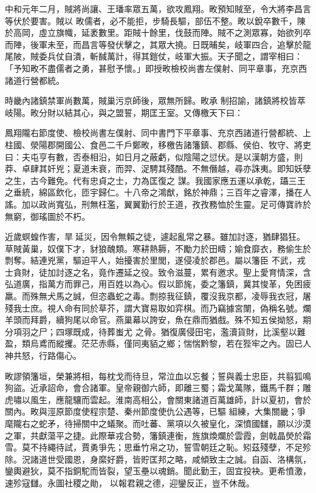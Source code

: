 \begin{pinyinscope}
 中和元年二月，賊將尚讓、王璠率眾五萬，欲攻鳳翔。畋預知賊至，令大將李昌言等伏於要害。賊以
 畋儒者，必不能拒，步騎長驅，部伍不整。畋以銳卒數千，陳於高岡，虛立旗幟，延袤數里。距賊十餘里，伐鼓而陣。賊不之測眾寡，始欲列卒而陣，後軍未至，而昌言等發伏擊之，其眾大撓。日既晡矣，岐軍四合，追擊於龍尾陂，賊委兵仗自潰，斬馘萬計，得其鎧仗，岐軍大振。天子聞之，謂宰相曰：「予知畋不盡儒者之勇，甚慰予懷。」即授畋檢校尚書左僕射、同平章事，充京西諸道行營都統。



 時畿內諸鎮禁軍尚數萬，賊巢污京師後，眾無所歸。畋承
 制招諭，諸鎮將校皆萃岐陽。畋分財以結其心，與之盟誓，期匡王室。又傳檄天下曰：



 鳳翔隴右節度使、檢校尚書左僕射、同中書門下平章事、充京西諸道行營都統、上柱國、滎陽郡開國公、食邑二千戶鄭畋，移檄告諸籓鎮、郡縣、侯伯、牧守、將吏曰：夫屯亨有數，否泰相沿，如日月之蔽虧，似陰陽之愆伏。是以漢朝方盛，則莽、卓肆其奸兇；夏道未衰，而羿、浞騁其殘酷。不無僭越，尋亦誅夷。即知妖孽之生，古今難免。代有忠貞之士，力為匡復之
 謀。我國家應五運以承乾，躡三王之垂統，綿區飲化，匝宇歸仁。十八帝之鴻猷，銘於神鼎；三百年之睿澤，播在人謠。加以政尚寬弘，刑無枉濫，翼翼勤行於王道，孜孜務恤於生靈。足可傳寶祚於無窮，御瑤圖於不朽。



 近歲螟蝗作害，旱延災，因令無賴之徒，遽起亂常之暴。雖加討逐，猶肆猖狂。草賊黃巢，奴僕下才，豺狼醜類。寒耕熱耨，不勵力於田疇；媮食靡衣，務偷生於剽奪。結連兇黨，驅迫平人，始擾害於里閭，遂侵凌於郡邑。屬以籓臣
 不武，戎士貪財，徒加討逐之名，竟作遷延之役。致令滋蔓，累有邀求。聖上愛育情深，含弘道廣，指萬方而罪己，用百姓以為心。假以節旄，委之籓鎮，冀其悛革，免困疲羸。而殊無犬馬之誠，但恣蟲蛇之毒。剽掠我征鎮，覆沒我京都，凌辱我衣冠，屠殘我士庶。視人命有同於草芥，謂大寶易取如弈棋。而乃竊據宮闈，偽稱名號。爛羊頭而拜爵，續狗尾以命官。燕巢幕以誇安，魚在鼎而猶戲。殊不知五侯拗怒，期分項羽之尸；四塚既成，待葬蚩尤
 之骨。猶復廣侵田宅，濫瀆貨財，比溪壑以難盈，類烏鳶而縱攫。茫茫赤縣，僅同夷貊之鄉；惴惴黔黎，若在狴牢之內。固已人神共怒，行路傷心。



 畋謬領籓垣，榮兼將相，每枕戈而待旦，常泣血以忘餐；誓與義士忠臣，共翦狐鳴狗盜。近承詔命，會合諸軍。皇帝親御六師，即離三蜀；霜戈萬隊，鐵馬千群；雕虎嘯以風生，應龍驤而雲起。淮南高相公，會關東諸道百萬雄師，計以夏初，會於關內。畋與涇原節度使程宗楚、秦州節度使仇公遇等，已驅
 組練，大集關畿；爭麾隴右之蛇矛，待掃關中之蟻聚。而吐蕃、黨項以久被皇化，深憤國讎，願以沙漠之軍，共獻蕩平之捷。此際華戎合勢，籓鎮連衡，旌旗煥爛於雲霞，劍戟晶熒於霜雪。莫不持繩待試，賈勇爭先；思垂竹帛之功，誓雪朝廷之恥。矧茲殘孽，不足殄除。況諸道世受國恩，身縻好爵，皆貯匡邦之略，咸傾致主之誠。自函、洛構氛，鑾輿避狄，莫不指銅駝而皆裂，望玉壘以魂銷。聞此勤王，固宜投袂。更希憤激，速殄寇讎。永圖社稷之勛，
 以報君親之德，迎鑾反正，豈不休哉。




\end{pinyinscope}
